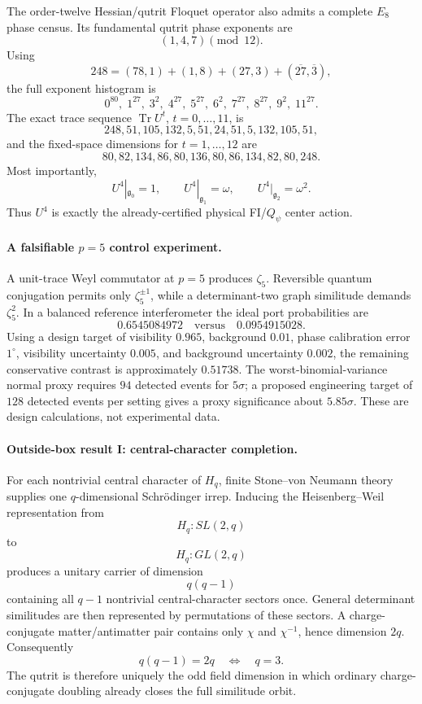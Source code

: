 The order-twelve Hessian/qutrit Floquet operator also admits a complete
\(E_8\) phase census.  Its fundamental qutrit phase exponents are
\[
(1,4,7)\pmod{12}.
\]
Using
\[
248=(78,1)+(1,8)+(27,3)+(\overline{27},\overline3),
\]
the full exponent histogram is
\[
\boxed{
0^{80},\;
1^{27},\;
3^2,\;
4^{27},\;
5^{27},\;
6^2,\;
7^{27},\;
8^{27},\;
9^2,\;
11^{27}.
}
\]
The exact trace sequence \(\operatorname{Tr}U^t\), \(t=0,\ldots,11\), is
\[
\boxed{
248,51,105,132,5,51,24,51,5,132,105,51,
}
\]
and the fixed-space dimensions for \(t=1,\ldots,12\) are
\[
\boxed{
80,82,134,86,80,136,80,86,134,82,80,248.
}
\]
Most importantly,
\[
\boxed{
U^4|_{\mathfrak g_0}=1,
\qquad
U^4|_{\mathfrak g_1}=\omega,
\qquad
U^4|_{\mathfrak g_2}=\omega^2.
}
\]
Thus \(U^4\) is exactly the already-certified physical FI/\(Q_\psi\) center
action.

\paragraph{A falsifiable \(p=5\) control experiment.}
A unit-trace Weyl commutator at \(p=5\) produces \(\zeta_5\).  Reversible
quantum conjugation permits only \(\zeta_5^{\pm1}\), while a determinant-two
graph similitude demands \(\zeta_5^2\).  In a balanced reference
interferometer the ideal port probabilities are
\[
0.6545084972
\quad\text{versus}\quad
0.0954915028.
\]
Using a design target of visibility \(0.965\), background \(0.01\), phase
calibration error \(1^\circ\), visibility uncertainty \(0.005\), and
background uncertainty \(0.002\), the remaining conservative contrast is
approximately \(0.51738\).  The worst-binomial-variance normal proxy requires
\(94\) detected events for \(5\sigma\); a proposed engineering target of
\(128\) detected events per setting gives a proxy significance about
\(5.85\sigma\).  These are design calculations, not experimental data.

\paragraph{Outside-box result I: central-character completion.}
For each nontrivial central character of \(H_q\), finite
Stone--von Neumann theory supplies one \(q\)-dimensional Schrödinger irrep.
Inducing the Heisenberg--Weil representation from
\[
H_q:SL(2,q)
\]
to
\[
H_q:GL(2,q)
\]
produces a unitary carrier of dimension
\[
\boxed{q(q-1)}
\]
containing all \(q-1\) nontrivial central-character sectors once.  General
determinant similitudes are then represented by permutations of these sectors.
A charge-conjugate matter/antimatter pair contains only \(\chi\) and
\(\chi^{-1}\), hence dimension \(2q\).  Consequently
\[
q(q-1)=2q
\quad\Longleftrightarrow\quad
\boxed{q=3}.
\]
The qutrit is therefore uniquely the odd field dimension in which ordinary
charge-conjugate doubling already closes the full similitude orbit.

